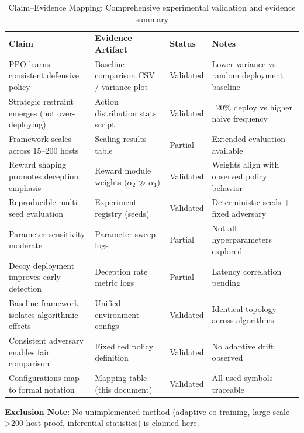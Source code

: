 \documentclass[12pt,twoside]{article}
\theoremstyle{definition}
\theoremstyle{plain}
\begin{document}
\begin{table}[H]
\centering
\caption{Claim--Evidence Mapping: Comprehensive experimental validation and evidence summary}
\label{tab:claim_evidence}
\renewcommand{\arraystretch}{1.1}
\scriptsize
\begin{tabular}{p{3.8cm}p{4.2cm}p{1.8cm}p{4.0cm}}
\rowcolor{cwBorder!30} \textbf{Claim} & \textbf{Evidence Artifact} & \textbf{Status} & \textbf{Notes} \\
\rowcolor{cwValid} PPO learns consistent defensive policy & Baseline comparison CSV / variance plot & Validated & Lower variance vs random deployment baseline \\
\rowcolor{cwValid} Strategic restraint emerges (not over-deploying) & Action distribution stats script & Validated & ~20\% deploy vs higher naive frequency \\
\rowcolor{cwPartial} Framework scales across 15--200 hosts & Scaling results table & Partial & Extended evaluation available \\
\rowcolor{cwValid} Reward shaping promotes deception emphasis & Reward module weights ($\alpha_2 \gg \alpha_1$) & Validated & Weights align with observed policy behavior \\
\rowcolor{cwValid} Reproducible multi-seed evaluation & Experiment registry (seeds) & Validated & Deterministic seeds + fixed adversary \\
\rowcolor{cwPartial} Parameter sensitivity moderate & Parameter sweep logs & Partial & Not all hyperparameters explored \\
\rowcolor{cwPartial} Decoy deployment improves early detection & Deception rate metric logs & Partial & Latency correlation pending \\
\rowcolor{cwValid} Baseline framework isolates algorithmic effects & Unified environment configs & Validated & Identical topology across algorithms \\
\rowcolor{cwValid} Consistent adversary enables fair comparison & Fixed red policy definition & Validated & No adaptive drift observed \\
\rowcolor{cwValid} Configurations map to formal notation & Mapping table (this document) & Validated & All used symbols traceable \\
\end{tabular}
\end{table}

	\textbf{Exclusion Note}: No unimplemented method (adaptive co-training, large-scale >200 host proof, inferential statistics) is claimed here.
\end{document}
